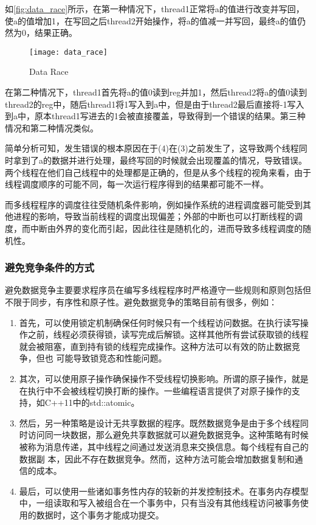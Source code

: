 如\autoref{fig:data_race}所示，在第一种情况下，thread1正常将a的值进行改变并写回，使a的值增加1，在写回之后thread2开始操作，将a的值减一并写回，最终a的值仍然为0，结果正确。

\begin{figure}[ht]
    \centering
    \texttt{[image: data\_race]}
    \caption{\label{fig:data_race}Data Race}
\end{figure}


在第二种情况下，thread1首先将a的值0读到reg并加1，然后thread2将a的值0读到thread2的reg中，随后thread1将1写入到a中，但是由于thread2最后直接将-1写入到a中，原本thread1写进去的1会被直接覆盖，导致得到一个错误的结果。第三种情况和第二种情况类似。

简单分析可知，发生错误的根本原因在于(4)在(3)之前发生了，这导致两个线程同时拿到了a的数据并进行处理，最终写回的时候就会出现覆盖的情况，导致错误。两个线程在他们自己线程中的处理都是正确的，但是从多个线程的视角来看，由于线程调度顺序的可能不同，每一次运行程序得到的结果都可能不一样。

而多线程程序的调度往往受随机条件影响，例如操作系统的进程调度器可能受到其他进程的影响，导致当前线程的调度出现偏差；外部的中断也可以打断线程的调度，而中断由外界的变化而引起，因此往往是随机化的，进而导致多线程调度的随机性。

\subsubsection{避免竞争条件的方式}

避免数据竞争主要要求程序员在编写多线程程序时严格遵守一些规则和原则包括但不限于同步，有序性和原子性。避免数据竞争的策略目前有很多，例如：

\begin{enumerate}
\item 首先，可以使用锁定机制确保任何时候只有一个线程访问数据。在执行读写操作之前，线程必须获得锁，读写完成后解锁。这样其他所有尝试获取锁的线程就会被阻塞，直到持有锁的线程完成操作。这种方法可以有效的防止数据竞争，但也 可能导致锁竞态和性能问题。
\item 其次，可以使用原子操作确保操作不受线程切换影响。所谓的原子操作，就是在执行中不会被线程切换打断的操作。一些编程语言提供了对原子操作的支持，如C++11中的std::atomic。
\item 然后，另一种策略是设计无共享数据的程序。既然数据竞争是由于多个线程同时访问同一块数据，那么避免共享数据就可以避免数据竞争。这种策略有时候被称为消息传递，其中线程之间通过发送消息来交换信息。每个线程有自己的数据副 本，因此不存在数据竞争。然而，这种方法可能会增加数据复制和通信的成本。
\item 最后，可以使用一些诸如事务性内存的较新的并发控制技术。在事务内存模型中，一组读取和写入被组合在一个事务中，只有当没有其他线程访问被事务使用的数据时，这个事务才能成功提交。
\end{enumerate}

